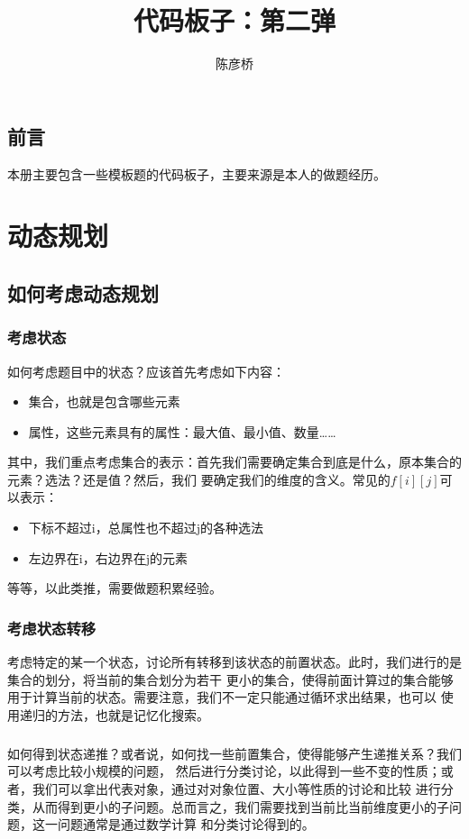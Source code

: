 \documentclass[12pt,a4paper,UTF16]{ctexbook}
\title{\bf{代码板子：第二弹}}
\author{陈彦桥}
\theoremstyle{plain}
\begin{document}
\maketitle

\section{前言}
本册主要包含一些模板题的代码板子，主要来源是本人的做题经历。

\tableofcontents

\chapter{动态规划}
\section{如何考虑动态规划}
\subsection{考虑状态}
如何考虑题目中的状态？应该首先考虑如下内容：
\begin{itemize}
    \item 集合，也就是包含哪些元素
    \item 属性，这些元素具有的属性：最大值、最小值、数量……
\end{itemize}
其中，我们重点考虑集合的表示：首先我们需要确定集合到底是什么，原本集合的元素？选法？还是值？然后，我们
要确定我们的维度的含义。常见的$f[i][j]$可以表示：
\begin{itemize}
    \item 下标不超过i，总属性也不超过j的各种选法
    \item 左边界在i，右边界在j的元素
\end{itemize}
等等，以此类推，需要做题积累经验。
\subsection{考虑状态转移}
考虑特定的某一个状态，讨论所有转移到该状态的前置状态。此时，我们进行的是集合的划分，将当前的集合划分为若干
更小的集合，使得前面计算过的集合能够用于计算当前的状态。需要注意，我们不一定只能通过循环求出结果，也可以
使用递归的方法，也就是记忆化搜索。
\paragraph{}如何得到状态递推？或者说，如何找一些前置集合，使得能够产生递推关系？我们可以考虑比较小规模的问题，
然后进行分类讨论，以此得到一些不变的性质；或者，我们可以拿出代表对象，通过对对象位置、大小等性质的讨论和比较
进行分类，从而得到更小的子问题。总而言之，我们需要找到当前比当前维度更小的子问题，这一问题通常是通过数学计算
和分类讨论得到的。
\end{document}
